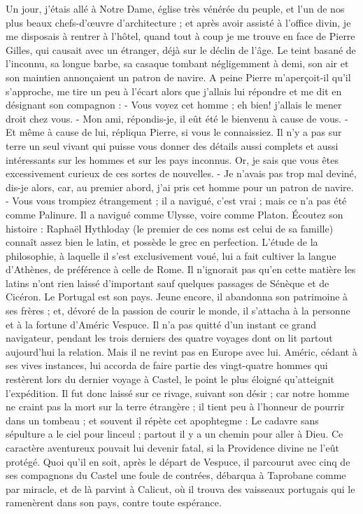\documentclass[12pt,a4paper]{book}
\begin{document}
\begin{pages}
\begin{Rightside}
		\pend
		\pstart
        Un jour, j'étais allé à Notre Dame, église très vénérée du peuple, et l'un de nos plus beaux chefs-d'œuvre d'architecture ; et après avoir assisté à l'office divin, je me disposais à rentrer à l'hôtel, quand tout à coup je me trouve en face de Pierre Gilles, qui causait avec un étranger, déjà sur le déclin de l'âge. Le teint basané de l'inconnu, sa longue barbe, sa casaque tombant négligemment à demi, son air et son maintien annonçaient un patron de navire. A peine Pierre m'aperçoit-il qu'il s'approche, me tire un peu à l'écart alors que j'allais lui répondre et me dit en désignant son compagnon : - Vous voyez cet homme ; eh bien! j'allais le mener droit chez vous. - Mon ami, répondis-je, il eût été le bienvenu à cause de vous. - Et même à cause de lui, répliqua Pierre, si vous le connaissiez. Il n'y a pas sur terre un seul vivant qui puisse vous donner des détails aussi complets et aussi intéressants sur les hommes et sur les pays inconnus. Or, je sais que vous êtes excessivement curieux de ces sortes de nouvelles. - Je n'avais pas trop mal deviné, dis-je alors, car, au premier abord, j'ai pris cet homme pour un patron de navire. - Vous vous trompiez étrangement ; il a navigué, c'est vrai ; mais ce n'a pas été comme Palinure. Il a navigué comme Ulysse, voire comme Platon.
		\pend
		\pstart
        Écoutez son histoire : Raphaël Hythloday (le premier de ces noms est celui de sa famille) connaît assez bien le latin, et possède le grec en perfection. L'étude de la philosophie, à laquelle il s'est exclusivement voué, lui a fait cultiver la langue d'Athènes, de préférence à celle de Rome. Il n'ignorait pas qu'en cette matière les latins n'ont rien laissé d'important sauf quelques passages de Sénèque et de Cicéron. Le Portugal est son pays. Jeune encore, il abandonna son patrimoine à ses frères ; et, dévoré de la passion de courir le monde, il s'attacha à la personne et à la fortune d'Améric Vespuce. Il n'a pas quitté d'un instant ce grand navigateur, pendant les trois derniers des quatre voyages dont on lit partout aujourd'hui la relation. Mais il ne revint pas en Europe avec lui. Améric, cédant à ses vives instances, lui accorda de faire partie des vingt-quatre hommes qui restèrent lors du dernier voyage à Castel, le point le plus éloigné qu'atteignit l'expédition. Il fut donc laissé sur ce rivage, suivant son désir ; car notre homme ne craint pas la mort sur la terre étrangère ; il tient peu à l'honneur de pourrir dans un tombeau ; et souvent il répète cet apophtegme : Le cadavre sans sépulture a le ciel pour linceul ; partout il y a un chemin pour aller à Dieu. Ce caractère aventureux pouvait lui devenir fatal, si la Providence divine ne l'eût protégé.
        \pend
        \pstart
        Quoi qu'il en soit, après le départ de Vespuce, il parcourut avec cinq de ses compagnons du Castel une foule de contrées, débarqua à Taprobane comme par miracle, et de là parvint à Calicut, où il trouva des vaisseaux portugais qui le ramenèrent dans son pays, contre toute espérance.
        \pend
        \endnumbering
    \end{Rightside}
 \end{pages}
 \Pages
\end{document}
